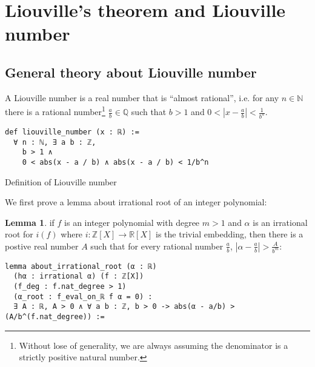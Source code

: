 \documentclass{report}
\theoremstyle{definition}
\newtheorem{lemma}{Lemma}[section]
\theoremstyle{plain}
\newenvironment{code}{\captionsetup{type=listing}}{}
\begin{document}
\section{Liouville's theorem and Liouville number}\label{fmlsn:li}
\subsection*{General theory about Liouville number}
A Liouville number is a real number that is ``almost rational'', i.e. for any $n\in\mathbb N$ there is a rational number\footnote{Without lose of generality, we are always assuming the denominator is a strictly positive natural number.} $\frac ab\in\mathbb Q$ such that $b > 1$ and $0<|x-\frac ab|<\frac1{b^n}$.
\begin{code}
\begin{verbatim}
def liouville_number (x : ℝ) := 
  ∀ n : ℕ, ∃ a b : ℤ,  
    b > 1 ∧ 
    0 < abs(x - a / b) ∧ abs(x - a / b) < 1/b^n
\end{verbatim}
\caption{Definition of Liouville number}
\end{code}

We first prove a lemma about irrational root of an integer polynomial:
\begin{lemma}\label{lemma:irrationalRoot}
if $f$ is an integer polynomial with degree $m>1$ and $\alpha$ is an irrational root for $i(f)$ where $i:\mathbb Z[X]\to\mathbb R[X]$ is the trivial embedding, then there is a postive real number $A$ such that for every rational number $\frac ab$, $\left|\alpha-\frac ab\right|>\frac A {b^m}$:  

\begin{verbatim}
lemma about_irrational_root (α : ℝ)
  (hα : irrational α) (f : ℤ[X]) 
  (f_deg : f.nat_degree > 1)
  (α_root : f_eval_on_ℝ f α = 0) :
  ∃ A : ℝ, A > 0 ∧ ∀ a b : ℤ, b > 0 -> abs(α - a/b) > (A/b^(f.nat_degree)) :=
\end{verbatim}
\end{lemma}
\end{document}
